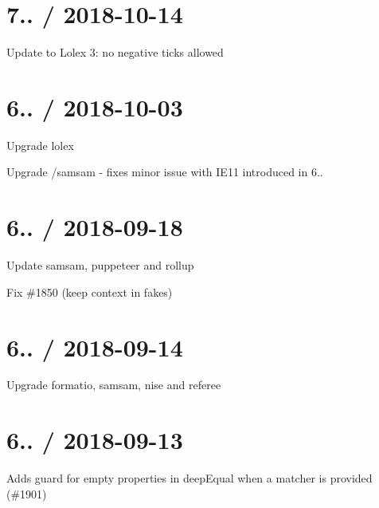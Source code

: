 \section*{7.. / 2018-\/10-\/14 }


\begin{DoxyItemize}
\item Update to Lolex 3\+: no negative ticks allowed
\end{DoxyItemize}

\section*{6.. / 2018-\/10-\/03 }


\begin{DoxyItemize}
\item Upgrade lolex
\item Upgrade /samsam -\/ fixes minor issue with I\+E11 introduced in 6..
\end{DoxyItemize}

\section*{6.. / 2018-\/09-\/18 }


\begin{DoxyItemize}
\item Update samsam, puppeteer and rollup
\item Fix \#1850 (keep context in fakes)
\end{DoxyItemize}

\section*{6.. / 2018-\/09-\/14 }


\begin{DoxyItemize}
\item Upgrade formatio, samsam, nise and referee
\end{DoxyItemize}

\section*{6.. / 2018-\/09-\/13 }


\begin{DoxyItemize}
\item Adds guard for empty properties in deep\+Equal when a matcher is provided (\#1901)
\end{DoxyItemize}

